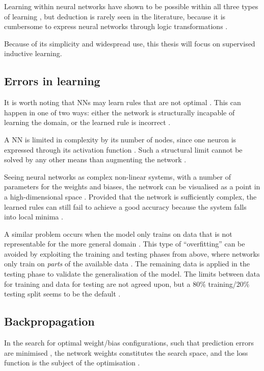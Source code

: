 \documentclass[report.tex]{subfiles}
\begin{document}
Learning within neural networks have shown to be possible within all three
types of learning \cite{Schmidhuber2014, Russel2007}, but deduction is rarely
seen in the literature, because it is cumbersome to express neural
networks through logic transformations \cite{Pearl2018}.

Because of its simplicity and widespread use, this thesis will focus on supervised
inductive learning.

\subsection{Errors in learning}
It is worth noting that \gls{NN}s may learn 
rules  that are not optimal \cite{Russel2007}.
This can happen in one of two ways: either the
network is structurally incapable of learning the domain, 
or the learned rule is incorrect \cite{Russel2007, Eliasmith2015}.

A \gls{NN} is limited in complexity by its number of nodes,
since one neuron is expressed through its activation function
\cite{Dayan2001, Russel2007}.
Such a structural limit cannot be solved by any other means
than augmenting the network \cite{Russel2007}.

Seeing neural networks as complex non-linear systems, with
a number of parameters for the weights and biases,
the network can be visualised as a point in a high-dimensional space 
\cite{Russel2007}. 
Provided that the network is sufficiently complex, the 
learned rules can still fail to achieve a good accuracy because
the system falls into local minima \cite{Russel2007}.

A similar problem occurs when the model only trains on data
that is not representable for the more general domain \cite{Russel2007}.
This type of ``overfitting'' can be avoided by exploiting the 
training and testing phases from above, where networks
only train on \textit{parts} of the available data
\cite{Russel2007, Schmidhuber2014}.
The remaining data is applied in the testing phase to
validate the generalisation of the model.
The limits between data for training and data for testing
are not agreed upon, but a 80\% training/20\% testing split seems to be
the default \cite{Russel2007, Schmidhuber2014}.

\subsection{Backpropagation}
In the search for optimal weight/bias configurations,
such that prediction errors are minimised \cite{Rumelhart1988},
the network weights constitutes the search space, 
and the loss function 
is the subject of the optimisation \cite{Russel2007}.
\end{document}
